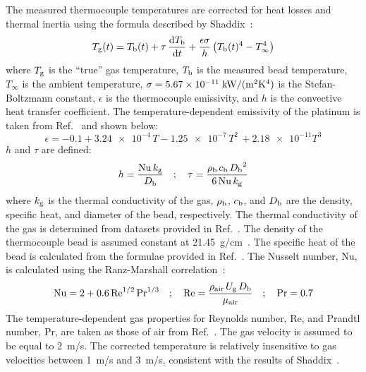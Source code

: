\documentclass[12pt]{article}
\begin{document}
The measured thermocouple temperatures are corrected for heat losses and thermal inertia using the formula described by Shaddix~\cite{Shaddix1999}:
\begin{equation}\label{eq:Thermocouple_Bead_Correction}
{T_{\rm g}(t)}= T_{\rm b}(t) + \tau \, \frac{{\rm d}T_{\rm b}}{{\rm d}t} + \frac{\epsilon\sigma}{h}\left(T_{\rm b}(t)^4-T_\infty^4\right)
\end{equation}
where $T_{\rm g}$ is the ``true'' gas temperature, $T_{\rm b}$ is the measured bead temperature, $T_\infty$ is the ambient temperature, $\sigma=5.67 \times 10^{-11} \; {\rm kW}/({\rm m}^2{\rm K}^4)$ is the Stefan-Boltzmann constant, $\epsilon$ is the thermocouple emissivity, and $h$ is the convective heat transfer coefficient. The temperature-dependent emissivity of the platinum is taken from Ref.~\cite{Shaddix1999} and shown below:
\begin{equation}\label{eq:epsilon}
\epsilon=-0.1+\num{3.24e-4} \, T - \num{1.25e-7} \, T^2 \, + \num{2.18e-11} T^3
\end{equation}
$h$ and $\tau$ are defined:
\begin{equation}\label{eq:h_eqn}
h=\frac{{\rm Nu} \, k_{\rm g}}{D_{\rm b}}  \quad ; \quad \tau= \frac{\rho_{\rm b} \, c_{\rm b} \, {D_{\rm b}}^2}{6 \, {\rm Nu} \, k_{\rm g}}
\end{equation}
where $k_{\rm g}$ is the thermal conductivity of the gas, $\rho_{\rm b}$, $c_{\rm b}$, and $D_{\rm b}$ are the density, specific heat, and diameter of the bead, respectively. The thermal conductivity of the gas is determined from datasets provided in Ref.~\cite{Touloukian1970}. The density of the thermocouple bead is assumed constant at 21.45~g/cm~\cite{Platinum2010}. The specific heat of the bead is calculated from the formulae provided in Ref.~\cite{Jaeger1939}. The Nusselt number, Nu, is calculated using the Ranz-Marshall correlation~\cite{Shaddix1999}:
\begin{equation}\label{eq:Nu_number}
{\rm Nu} = 2 + 0.6 \, \textrm{Re}^{1/2} \, \textrm{Pr}^{1/3} \quad ; \quad \textrm{Re} = \frac{ \rho_{\rm air} \, U_{\rm g} \, D_{\rm b} }{\mu_{\rm air}}  \quad ; \quad \textrm{Pr}=0.7
\end{equation}
The temperature-dependent gas properties for Reynolds number, Re, and Prandtl number, Pr, are taken as those of air from Ref.~\cite{Incropera2007}. The gas velocity is assumed to be equal to 2~m/s. The corrected temperature is relatively insensitive to gas velocities between 1~m/s and 3~m/s, consistent with the results of Shaddix~\cite{Shaddix1999}.
\end{document}
